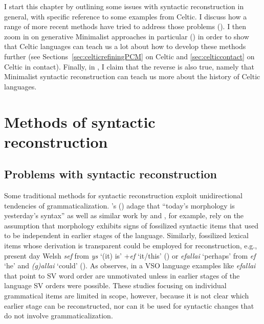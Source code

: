 \documentclass[output=paper,colorlinks,citecolor=brown]{langscibook}
\begin{document}
I start this chapter by outlining some issues with syntactic reconstruction in general, with specific reference to some examples from Celtic. I discuss how a range of more recent methods have tried to address those problems (). I then zoom in on generative Minimalist approaches in particular () in order to show that Celtic languages can teach us a lot about how to develop these methods further (see Sections~\ref{sec:celticrefiningPCM} on Celtic and \ref{sec:celticcontact} on Celtic in contact). Finally, in , I claim that the reverse is also true, namely that  Minimalist syntactic reconstruction can teach us more about the history of Celtic languages.

\section{Methods of syntactic reconstruction}
\label{sec:methods}

\subsection{Problems with syntactic reconstruction}
\label{subsec:submethods}

Some traditional methods for syntactic reconstruction exploit unidirectional tendencies of grammaticalization. \citeauthor{mm:givon_historical_1971}'s (\citeyear{mm:givon_historical_1971}) adage that “today's morphology is yesterday's syntax” as well as similar work by \citet{mm:gildea_reconstructing_2000} and \citet{mm:balles2008principles}, for example, rely on the assumption that morphology exhibits signs of fossilized syntactic items that used to be independent in earlier stages of the language. Similarly, fossilized lexical items whose derivation is transparent could be employed for reconstruction, e.g., present day Welsh \textit{sef} from \textit{ys} `(it) is' +\textit{ef} `it/this' (\citealt{mm:meelen_why_2016}) or \textit{efallai} `perhaps' from \textit{ef} `he' and \textit{(g)allai} `could' (\cite[14]{mm:willis_reconstructing_2011}). As \citet{mm:willis_reconstructing_2011} observes, in a VSO language examples like \textit{efallai} that point to SV word order are unmotivated unless in earlier stages of the language SV orders were possible. These studies focusing on individual grammatical items are limited in scope, however, because it is not clear which earlier stage can be reconstructed, nor can it be used for syntactic changes that do not involve grammaticalization.
\end{document}
